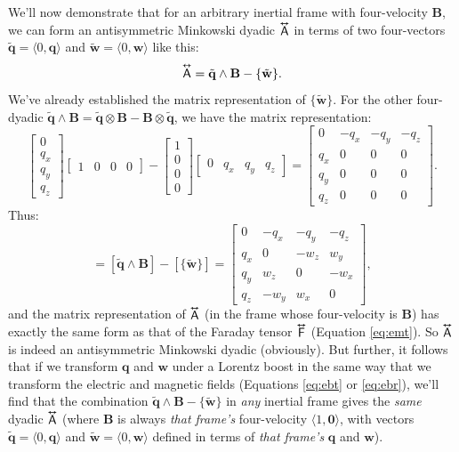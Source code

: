 \documentclass[12pt]{article}
\renewcommand{\vv}[1]{\mathbf{#1}}
\newcommand{\tightoverset}[2]{%
  \mathop{#2}\limits^{\vbox to -.5ex{\kern-0.75ex\hbox{$#1$}\vss}}}
\newcommand{\inlinedy}[1]{\tightoverset{\text{\tiny$\bm\leftrightarrow$}}{#1}}
\newcommand{\capdy}[1]{ \overset{ \text{\tiny$\bm\leftrightarrow$} }{\vphantom{\text{\small{A}}}\smash{#1}} }
\begin{document}
We'll now demonstrate that for an arbitrary inertial frame with four-velocity $\vv B$, we can form an antisymmetric Minkowski dyadic $\inlinedy{\mathsf{A}}$ in terms of two four-vectors $\tilde{\vv q} = \langle 0, \vv q \rangle$ and $\tilde{\vv w} = \langle 0, \vv w \rangle$ like this:
\begin{equation*}
\capdy{\mathsf{A}} = \tilde{\vv q} \wedge \vv B - \{ \tilde{\vv w} \}.
\end{equation*}
We've already established the matrix representation of $\{ \tilde{\vv w} \}$. For the other four-dyadic $\tilde{\vv q} \wedge \vv B = \tilde{\vv q} \otimes \vv B - \vv B \otimes \tilde{\vv q}$, we have the matrix representation:
\begin{equation*}
\begin{bmatrix}
0 \\
q_x \\
q_y \\
q_z
\end{bmatrix}
\begin{bmatrix}
1 & 0 & 0 & 0
\end{bmatrix}
-
\begin{bmatrix}
1 \\
0 \\
0 \\
0
\end{bmatrix}
\begin{bmatrix}
0 & q_x & q_y & q_z
\end{bmatrix}
=
\begin{bmatrix}
0 & -q_x & -q_y & -q_z \\
q_x & 0 & 0 & 0 \\
q_y & 0 & 0 & 0 \\
q_z & 0 & 0 & 0
\end{bmatrix}.
\end{equation*}
Thus:
\begin{equation*}
[\capdy{\mathsf{A}}] = [\tilde{\vv q} \wedge \vv B] - [\{ \tilde{\vv w} \}]
=
\begin{bmatrix}
0 & -q_x & -q_y & -q_z \\[.5ex]
q_x & 0 & -w_z & w_y \\[.5ex]
q_y & w_z & 0 & -w_x \\[.5ex]
q_z & -w_y & w_x & 0
\end{bmatrix},
\end{equation*}
and the matrix representation of $\inlinedy{\mathsf{A}}$ (in the frame whose four-velocity is $\vv B$) has exactly the same form as that of the Faraday tensor $\inlinedy{\mathsf{F}}$ (Equation \ref{eq:emt}). So $\inlinedy{\mathsf{A}}$ is indeed an antisymmetric Minkowski dyadic (obviously). But further, it follows that if we transform $\vv q$ and $\vv w$ under a Lorentz boost in the same way that we transform the electric and magnetic fields (Equations \ref{eq:ebt} or \ref{eq:ebr}), we'll find that the combination ${\tilde{\vv q} \wedge \vv B - \{ \tilde{\vv w} \}}$ in \emph{any} inertial frame gives the \emph{same} dyadic $\inlinedy{\mathsf{A}}$ (where $\vv B$ is always \emph{that frame's} four-velocity $\langle 1, \vv 0 \rangle$, with vectors $\tilde{\vv q} = \langle 0, \vv q \rangle$ and $\tilde{\vv w} = \langle 0, \vv w \rangle$ defined in terms of \emph{that frame's} $\vv q$ and $\vv w$).
\end{document}
